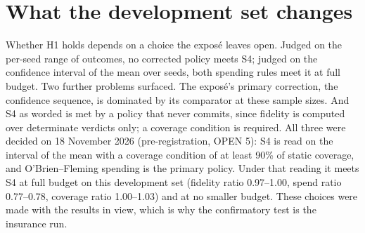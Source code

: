 \section{What the development set changes}
Whether H1 holds depends on a choice the expos\'e leaves open. Judged on the per-seed range of outcomes, no corrected policy meets S4; judged on the confidence interval of the mean over seeds, both spending rules meet it at full budget. Two further problems surfaced. The expos\'e's primary correction, the confidence sequence, is dominated by its comparator at these sample sizes. And S4 as worded is met by a policy that never commits, since fidelity is computed over determinate verdicts only; a coverage condition is required. All three were decided on 18 November 2026 (pre-registration, OPEN 5): S4 is read on the interval of the mean with a coverage condition of at least 90\% of static coverage, and O'Brien--Fleming spending is the primary policy. Under that reading it meets S4 at full budget on this development set (fidelity ratio 0.97--1.00, spend ratio 0.77--0.78, coverage ratio 1.00--1.03) and at no smaller budget. These choices were made with the results in view, which is why the confirmatory test is the insurance run.
